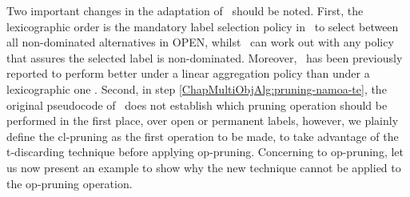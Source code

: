 Two important changes in the adaptation of \namoa \ should be noted. First, the lexicographic order is the mandatory label selection policy in \namoate \ to select between all non-dominated alternatives in OPEN, whilst \namoa \ can work out with any policy that assures the selected label is non-dominated. Moreover, \namoa \ has been previously reported to perform better under a linear aggregation policy than under a lexicographic one \citep{Machuca2011}. Second, in step \ref{ChapMultiObjAlg:pruning-namoa-te}, the original pseudocode of \namoa \ does not establish which pruning operation should be performed in the first place, over open or permanent labels, however, we plainly define the cl-pruning as the first operation to be made, to take advantage of the t-discarding technique before applying op-pruning. Concerning to op-pruning, let us now present an example to show why the new technique cannot be applied to the op-pruning operation.

